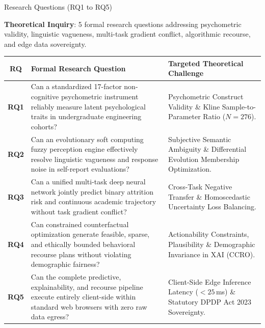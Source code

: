 \documentclass{beamer}
\begin{document}
\begin{frame}[t]{Research Questions (RQ1 to RQ5)}
  \vspace{-0.22cm}
  \begin{topsummarybar}
    \fontsize{5.8pt}{7.0pt}\selectfont
    \textbf{\color{NavyDark}Theoretical Inquiry}: 5 formal research questions addressing psychometric validity, linguistic vagueness, multi-task gradient conflict, algorithmic recourse, and edge data sovereignty.
  \end{topsummarybar}
  \vspace{-0.30cm}

  \begin{tcolorbox}[colback=white, colframe=BlueDeep, arc=1.5mm, boxrule=0.8pt, top=0.3mm, bottom=0.3mm, left=0.8mm, right=0.8mm]
    \fontsize{4.5pt}{5.4pt}\selectfont
    \renewcommand{\arraystretch}{0.80}
    \begin{tabularx}{\linewidth}{@{}c X p{3.8cm}@{}}
      \toprule
      \rowcolor{NavyDark}
      \textbf{\color{white}RQ} & \textbf{\color{white}Formal Research Question} & \textbf{\color{white}Targeted Theoretical Challenge} \\
      \midrule
      \rowcolor{BlueLight} \textbf{RQ1} & Can a standardized 17-factor non-cognitive psychometric instrument reliably measure latent psychological traits in undergraduate engineering cohorts? & Psychometric Construct Validity \& Kline Sample-to-Parameter Ratio ($N=276$). \\
      \midrule
      \rowcolor{CanvasBG} \textbf{RQ2} & Can an evolutionary soft computing fuzzy perception engine effectively resolve linguistic vagueness and response noise in self-report evaluations? & Subjective Semantic Ambiguity \& Differential Evolution Membership Optimization. \\
      \midrule
      \rowcolor{BlueLight} \textbf{RQ3} & Can a unified multi-task deep neural network jointly predict binary attrition risk and continuous academic trajectory without task gradient conflict? & Cross-Task Negative Transfer \& Homoscedastic Uncertainty Loss Balancing. \\
      \midrule
      \rowcolor{CanvasBG} \textbf{RQ4} & Can constrained counterfactual optimization generate feasible, sparse, and ethically bounded behavioral recourse plans without violating demographic fairness? & Actionability Constraints, Plausibility \& Demographic Invariance in XAI (CCRO). \\
      \midrule
      \rowcolor{BlueLight} \textbf{RQ5} & Can the complete predictive, explainability, and recourse pipeline execute entirely client-side within standard web browsers with zero raw data egress? & Client-Side Edge Inference Latency ($<25$\,ms) \& Statutory DPDP Act 2023 Sovereignty. \\
      \bottomrule
    \end{tabularx}
  \end{tcolorbox}
  \vspace{-0.34cm}


\end{frame}
\end{document}
